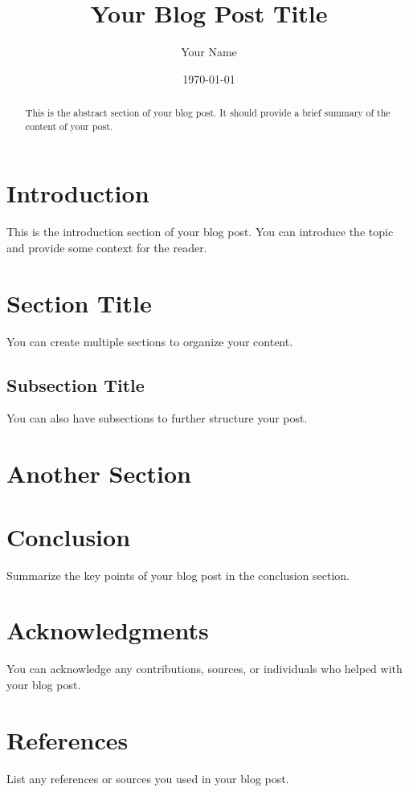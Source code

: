 ﻿\documentclass{article}
\title{Your Blog Post Title}
\author{Your Name}
\date{\today}
\begin{document}
\maketitle

\begin{abstract}
This is the abstract section of your blog post. It should provide a brief summary of the content of your post.
\end{abstract}

\section{Introduction}

This is the introduction section of your blog post. You can introduce the topic and provide some context for the reader.

\section{Section Title}

You can create multiple sections to organize your content.

\subsection{Subsection Title}

You can also have subsections to further structure your post.

\section{Another Section}

\lipsum[1-3] %

\section{Conclusion}

Summarize the key points of your blog post in the conclusion section.

\section*{Acknowledgments}

You can acknowledge any contributions, sources, or individuals who helped with your blog post.

\section*{References}

List any references or sources you used in your blog post.
\end{document}
